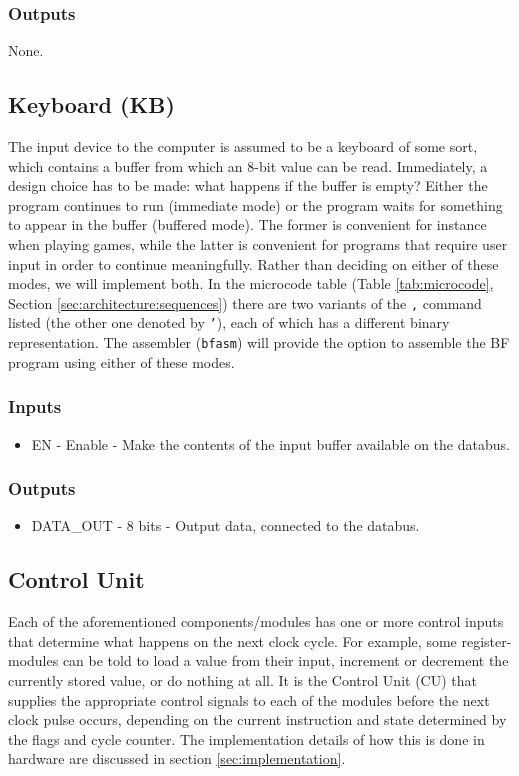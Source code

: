 \subsubsection*{Outputs}
None.


\subsection{Keyboard (KB)} \label{sec:architecture:kb}
The input device to the computer is assumed to be a keyboard of some sort, which contains a buffer from which an 8-bit value can be read. Immediately, a design choice has to be made: what happens if the buffer is empty? Either the program continues to run (immediate mode) or the program waits for something to appear in the buffer (buffered mode). The former is convenient for instance when playing games, while the latter is convenient for programs that require user input in order to continue meaningfully. Rather than deciding on either of these modes, we will implement both. In the microcode table (Table \ref{tab:microcode}, Section \ref{sec:architecture:sequences}) there are two variants of the \texttt{,} command listed (the other one denoted by \texttt{'}), each of which has a different binary representation. The assembler (\texttt{bfasm}) will provide the option to assemble the BF program using either of these modes.

\subsubsection*{Inputs}
\begin{itemize}
\itemsep0em 
\item EN - Enable - Make the contents of the input buffer available on the databus.
\end{itemize}

\subsubsection*{Outputs}
\begin{itemize}
\itemsep0em 
\item DATA\_OUT - 8 bits - Output data, connected to the databus.
\end{itemize}



\subsection{Control Unit} \label{sec:architecture:cu}
Each of the aforementioned components/modules has one or more control inputs that determine what happens on the next clock cycle. For example, some register-modules can be told to load a value from their input, increment or decrement the currently stored value, or do nothing at all. It is the Control Unit (CU) that supplies the appropriate control signals to each of the modules before the next clock pulse occurs, depending on the current instruction and state determined by the flags and cycle counter. The implementation details of how this is done in hardware are discussed in section \ref{sec:implementation}.

